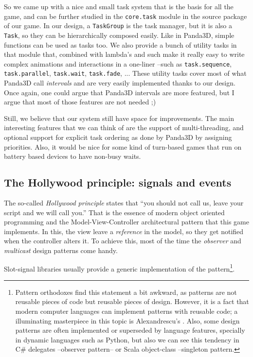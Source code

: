 \documentclass[a4paper,10pt]{article}
\begin{document}
So we came up with a nice and small task system that is the basis
for all the game, and can be further studied in the
\texttt{core.task} module in the source package of our game. In our
design, a \texttt{TaskGroup} is the task manager, but it is also a
\texttt{Task}, so they can be hierarchically composed easily. Like
in Panda3D, simple functions can be used as tasks too. We also
provide a bunch of utility tasks in that module that, combined with
lambda's and such make it really easy to write complex animations
and interactions in a one-liner --such as \texttt{task.sequence},
\texttt{task.parallel}, \texttt{task.wait}, \texttt{task.fade},
... These utility tasks cover most of what Panda3D call
\emph{intervals} and are very easily implemented thanks to our
design. Once again, one could argue that Panda3D intervals are more
featured, but I argue that most of those features are not needed ;)

Still, we believe that our system still have space for
improvements. The main interesting features that we can think of are
the support of multi-threading, and optional support for explicit task
ordering as done by Panda3D by assigning priorities. Also, it would be
nice for some kind of turn-based games that run on battery based
devices to have non-busy waits.

\subsection{The Hollywood principle: signals and events}
\label{sec:hollywood}
The so-called \emph{Hollywood principle} states that ``you should not
call us, leave your script and we will call you.'' That is the essence
of modern object oriented programming and the Model-View-Controller
architectural pattern that this game implements. In this, the view
leave a \emph{reference} in the model, so they get notified when the
controller alters it. To achieve this, most of the time the
\emph{observer}\cite{gof} and \emph{multicast}\cite{hatching} design
patterns come handy.

Slot-signal libraries usually provide a generic implementation of the
pattern\footnote{Pattern orthodoxes find this statement a bit awkward,
as patterns are not reusable pieces of code but reusable pieces of
design. However, it is a fact that modern computer languages can
implement patterns with reusable code; a illuminating masterpiece in
this topic is Alexandrescu's \cite{moderncpp}. Also, some design
patterns are often implemented or superseded by language features,
specially in dynamic languages such as Python, but also we can see
this tendency in C\# delegates --observer pattern-- or Scala
object-class --singleton pattern.}.
\end{document}
